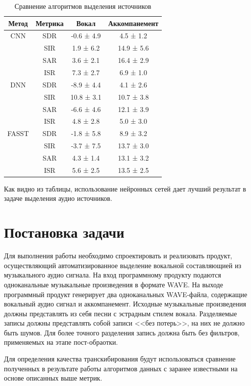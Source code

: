 \begin{table}[h]
	\caption{\label{tab:canonsummary}Сравнение алгоритмов выделения источников}
	\begin{center}
		\begin{tabular}{|c|c|c|c|}
			\hline
			Метод & Метрика & Вокал & Аккомпанемент \\
			\hline
			CNN & SDR & -0.6 ± 4.9 & 4.5 ± 1.2 \\
				& SIR & 1.9 ± 6.2 & 14.9 ± 5.6 \\
				& SAR & 3.6 ± 2.1 & 16.4 ± 2.9 \\
				& ISR & 7.3 ± 2.7 & 6.9 ± 1.0 \\
			\hline
			DNN & SDR & -8.9 ± 4.4 & 4.1 ± 2.6 \\
			& SIR & 10.8 ± 3.1 & 10.7 ± 3.8 \\
			& SAR & -6.6 ± 4.6 & 12.1 ± 3.9 \\
			& ISR & 4.8 ± 2.8 & 5.0 ± 3.0 \\
			\hline
			FASST & SDR & -1.8 ± 5.8 & 8.9 ± 3.2 \\
			& SIR & -3.7 ± 7.5 & 13.7 ± 3.0 \\
			& SAR & 4.3 ± 1.4 & 13.1 ± 3.2 \\
			& ISR & 5.6 ± 2.5 & 13.5 ± 2.5 \\
			\hline
		\end{tabular}
	\end{center}
\end{table} 

Как видно из таблицы, использование нейронных сетей дает лучший результат в задаче выделения аудио источников.

\section{Постановка задачи}

Для выполнения работы необходимо спроектировать и реализовать продукт, осуществляющий автоматизированное выделение вокальной составляющией из музыкального аудио сигнала. На вход программному продукту подаются одноканальные музыкальные произведения в формате WAVE. На выходе программный продукт генерирует два одноканальных WAVE-файла, содержащие вокальный аудио сигнал и аккомпанемент. Исходные музыкальные произведения должны представлять из себя песни с эстрадным стилем вокала. Разделяемые записы должны представлять собой записи <<без потерь>>, на них не должно быть шумов. Для более точного разделения запись должна быть без фильтров, применяемых на этапе пост-обраотки.

Для определения качества транскибирования будут использоваться сравнение полученных в результате работы алгоритмов данных с заранее известными на основе описанных выше метрик.

